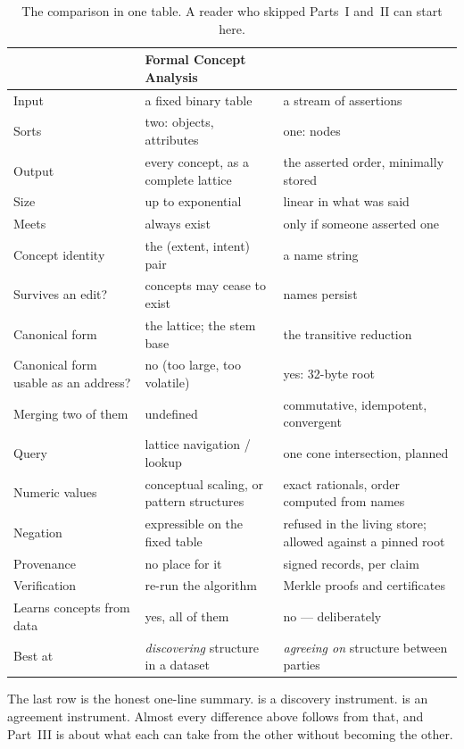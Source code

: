 \begin{table}[h]\centering\small
\caption{The comparison in one table. A reader who skipped Parts~I and~II can
start here.}
\label{tab:summary}
\vspace{1mm}
\begin{tabularx}{\textwidth}{@{}p{3.5cm} X X@{}}
\toprule
& \textbf{Formal Concept Analysis} & \textbf{\odag{}}\\
\midrule
Input & a fixed binary table & a stream of assertions\\
Sorts & two: objects, attributes & one: nodes\\
Output & every concept, as a complete lattice & the asserted order, minimally
  stored\\
Size & up to exponential & linear in what was said\\
Meets & always exist & only if someone asserted one\\
Concept identity & the (extent, intent) pair & a name string\\
Survives an edit? & concepts may cease to exist & names persist\\
Canonical form & the lattice; the stem base & the transitive reduction\\
Canonical form usable as an address? & no (too large, too volatile) & yes:
  32-byte root\\
Merging two of them & undefined & commutative, idempotent, convergent\\
Query & lattice navigation / lookup & one cone intersection, planned\\
Numeric values & conceptual scaling, or pattern structures & exact rationals,
  order computed from names\\
Negation & expressible on the fixed table & refused in the living store;
  allowed against a pinned root\\
Provenance & no place for it & signed records, per claim\\
Verification & re-run the algorithm & Merkle proofs and certificates\\
Learns concepts from data & yes, all of them & no --- deliberately\\
Best at & \emph{discovering} structure in a dataset & \emph{agreeing on}
  structure between parties\\
\bottomrule
\end{tabularx}
\end{table}

The last row is the honest one-line summary. \fca{} is a discovery instrument.
\odag{} is an agreement instrument. Almost every difference above follows from
that, and Part~III is about what each can take from the other without
becoming the other.
